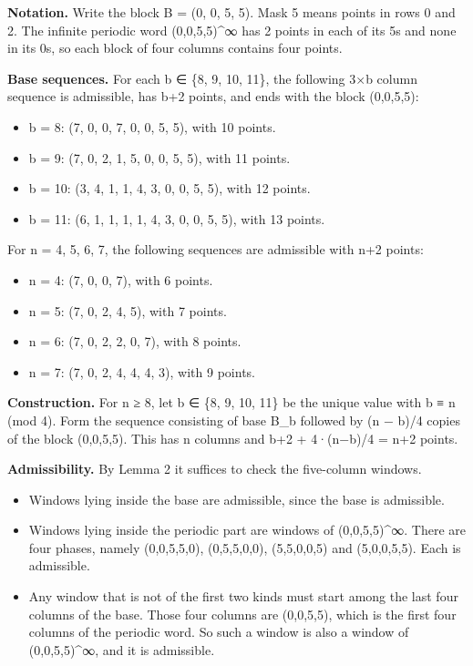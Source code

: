 \documentclass[
  11pt,
]{article}
\providecommand{\tightlist}{%
  \setlength{\itemsep}{0pt}\setlength{\parskip}{0pt}}
\begin{document}
\textbf{Notation.} Write the block B = (0, 0, 5, 5). Mask 5 means points
in rows 0 and 2. The infinite periodic word (0,0,5,5)\^{}∞ has 2 points
in each of its 5s and none in its 0s, so each block of four columns
contains four points.

\textbf{Base sequences.} For each b ∈ \{8, 9, 10, 11\}, the following
3×b column sequence is admissible, has b+2 points, and ends with the
block (0,0,5,5):

\begin{itemize}
\tightlist
\item
  b = 8: (7, 0, 0, 7, 0, 0, 5, 5), with 10 points.
\item
  b = 9: (7, 0, 2, 1, 5, 0, 0, 5, 5), with 11 points.
\item
  b = 10: (3, 4, 1, 1, 4, 3, 0, 0, 5, 5), with 12 points.
\item
  b = 11: (6, 1, 1, 1, 1, 4, 3, 0, 0, 5, 5), with 13 points.
\end{itemize}

For n = 4, 5, 6, 7, the following sequences are admissible with n+2
points:

\begin{itemize}
\tightlist
\item
  n = 4: (7, 0, 0, 7), with 6 points.
\item
  n = 5: (7, 0, 2, 4, 5), with 7 points.
\item
  n = 6: (7, 0, 2, 2, 0, 7), with 8 points.
\item
  n = 7: (7, 0, 2, 4, 4, 4, 3), with 9 points.
\end{itemize}

\textbf{Construction.} For n ≥ 8, let b ∈ \{8, 9, 10, 11\} be the unique
value with b ≡ n (mod 4). Form the sequence consisting of base B\_b
followed by (n − b)/4 copies of the block (0,0,5,5). This has n columns
and b+2 + 4·(n−b)/4 = n+2 points.

\textbf{Admissibility.} By Lemma 2 it suffices to check the five-column
windows.

\begin{itemize}
\tightlist
\item
  Windows lying inside the base are admissible, since the base is
  admissible.
\item
  Windows lying inside the periodic part are windows of (0,0,5,5)\^{}∞.
  There are four phases, namely (0,0,5,5,0), (0,5,5,0,0), (5,5,0,0,5)
  and (5,0,0,5,5). Each is admissible.
\item
  Any window that is not of the first two kinds must start among the
  last four columns of the base. Those four columns are (0,0,5,5), which
  is the first four columns of the periodic word. So such a window is
  also a window of (0,0,5,5)\^{}∞, and it is admissible.
\end{itemize}
\end{document}
